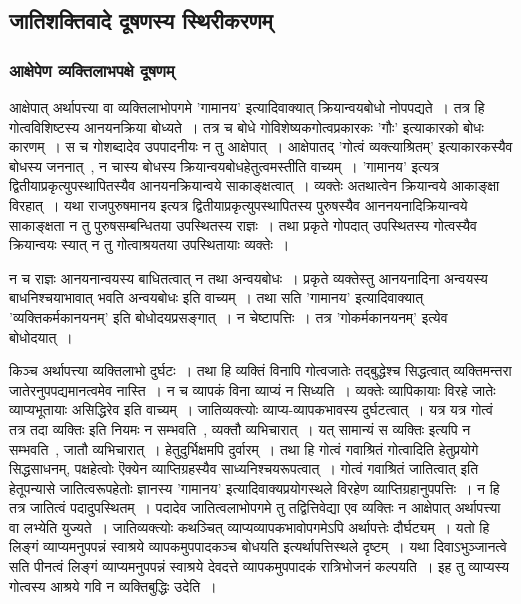 		\subsection{जातिशक्तिवादे दूषणस्य स्थिरीकरणम्}

			
			\subsubsection{आक्षेपेण व्यक्तिलाभपक्षे दूषणम्}

				आक्षेपात् अर्थापत्त्या वा व्यक्तिलाभोपगमे 'गामानय' इत्यादिवाक्यात् क्रियान्वयबोधो नोपपद्यते~। तत्र हि गोत्वविशिष्टस्य आनयनक्रिया बोध्यते~। तत्र च बोधे गोविशेष्यकगोत्वप्रकारकः 'गौः' इत्याकारको बोधः कारणम्~। स च गोशब्दादेव उपपादनीयः न तु आक्षेपात्~। आक्षेपातद् 'गोत्वं व्यक्त्याश्रितम्' इत्याकारकस्यैव बोधस्य जननात्~,  न चास्य बोधस्य क्रियान्वयबोधहेतुत्वमस्तीति वाच्यम्~। 'गामानय' इत्यत्र द्वितीयाप्रकृत्युपस्थापितस्यैव आनयनक्रियान्वये साकाङ्क्षत्वात्~। व्यक्तेः अतथात्वेन क्रियान्वये आकाङ्क्षा विरहात्~। यथा राजपुरुषमानय इत्यत्र  द्वितीयाप्रकृत्युपस्थापितस्य पुरुषस्यैव आननयनादिक्रियान्वये साकाङ्क्षता न तु पुरुषसम्बन्धितया उपस्थितस्य राज्ञः~। तथा प्रकृते गोपदात् उपस्थितस्य गोत्वस्यैव क्रियान्वयः स्यात् न तु गोत्वाश्रयतया उपस्थितायाः व्यक्तेः~।

				न च राज्ञः आनयनान्वयस्य बाधितत्वात् न तथा अन्वयबोधः~।  प्रकृते व्यक्तेस्तु आनयनादिना अन्वयस्य बाधनिश्चयाभावात्  भवति अन्वयबोधः  इति वाच्यम्~।  तथा सति ’गामानय’ इत्यादिवाक्यात् ’व्यक्तिकर्मकानयनम्’ इति बोधोदयप्रसङ्गात्~।  न चेष्टापत्तिः~।  तत्र ’गोकर्मकानयनम्’ इत्येव बोधोदयात्~। 

				किञ्च अर्थापत्त्या व्यक्तिलाभो दुर्घटः~।  तथा हि व्यक्तिं विनापि गोत्वजातेः तद्बुद्धेश्च सिद्धत्वात् व्यक्तिमन्तरा जातेरनुपपद्यमानत्वमेव नास्ति~।  न च व्यापकं विना व्याप्यं न सिध्यति~।  व्यक्तेः व्यापिकायाः विरहे जातेः व्याप्यभूतायाः असिद्धिरेव  इति वाच्यम्~।  जातिव्यक्त्योः  व्याप्य-व्यापकभावस्य दुर्घटत्वात्~।  यत्र यत्र गोत्वं तत्र तदा व्यक्तिः इति नियमः न सम्भवति~, व्यक्तौ व्यभिचारात्~।  यत् सामान्यं स व्यक्तिः इत्यपि न सम्भवति~, जातौ व्यभिचारात्~।  हेतुदुर्भिक्षमपि दुर्वारम्~।  तथा हि गोत्वं गवाश्रितं गोत्वादिति हेतुप्रयोगे सिद्धसाधनम्, पक्षहेत्वोः ऎक्येन  व्याप्तिग्रहस्यैव  साध्यनिश्चयरूपत्वात्~।  गोत्वं गवाश्रितं जातित्वात् इति हेतूपन्यासे  जातित्वरूपहेतोः ज्ञानस्य ’गामानय’  इत्यादिवाक्यप्रयोगस्थले विरहेण व्याप्तिग्रहानुपपत्तिः~।  न हि तत्र जातित्वं पदादुपस्थितम्~।  पदादेव जातित्वलाभोपगमे  तु तद्वित्तिवेद्या एव व्यक्तिः न आक्षेपात् अर्थापत्त्या वा लभ्येति युज्यते~।  जातिव्यक्त्योः कथञ्चित् व्याप्यव्यापकभावोपगमेऽपि अर्थापत्तेः दौर्घट्यम्~।  यतो हि लिङ्गं व्याप्यमनुपपन्नं स्वाश्रये व्यापकमुपपादकञ्च बोधयति इत्यर्थापत्तिस्थले दृष्टम्~।  यथा दिवाऽभुञ्जानत्वे सति पीनत्वं लिङ्गं व्याप्यमनुपपन्नं स्वाश्रये देवदत्ते व्यापकमुपपादकं रात्रिभोजनं कल्पयति~।  इह तु व्याप्यस्य गोत्वस्य आश्रये गवि न व्यक्तिबुद्धिः उदेति~। 
	
